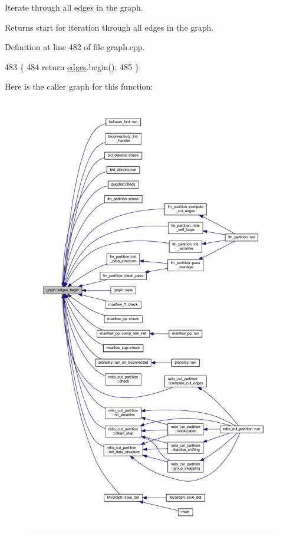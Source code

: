 Iterate through all edges in the graph.

\begin{DoxyReturn}{Returns}
start for iteration through all edges in the graph. 
\end{DoxyReturn}


Definition at line 482 of file graph.\+cpp.


\begin{DoxyCode}
483 \{
484     \textcolor{keywordflow}{return} \mbox{\hyperlink{classgraph_ab5b1c610cca1bcf72b05aacc28a48153}{edges}}.begin();
485 \}
\end{DoxyCode}
Here is the caller graph for this function\+:
\nopagebreak
\begin{figure}[H]
\begin{center}
\leavevmode
\includegraphics[height=550pt]{classgraph_a7ba35a4c4e8343ffb27ed6d9703c6f18_icgraph}
\end{center}
\end{figure}
\mbox{\label{classgraph_aea8d7f976b85b6137f52d915e26639f6}} 
